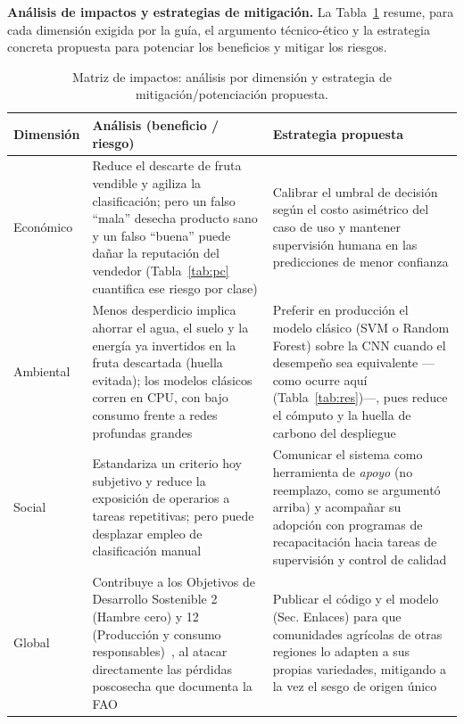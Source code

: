 \documentclass[conference]{IEEEtran}
\begin{document}
\textbf{Análisis de impactos y estrategias de mitigación.} La Tabla~\ref{tab:impactos}
resume, para cada dimensión exigida por la guía, el argumento técnico-ético y la
estrategia concreta propuesta para potenciar los beneficios y mitigar los
riesgos.

\begin{table}[t]
\caption{Matriz de impactos: análisis por dimensión y estrategia de
mitigación/potenciación propuesta.}
\label{tab:impactos}
\centering
\begin{tabular}{p{1.3cm}p{3.0cm}p{3.1cm}}
\toprule
Dimensión & Análisis (beneficio / riesgo) & Estrategia propuesta \\
\midrule
Económico & Reduce el descarte de fruta vendible y agiliza la clasificación;
pero un falso ``mala'' desecha producto sano y un falso ``buena'' puede dañar
la reputación del vendedor (Tabla~\ref{tab:pc} cuantifica ese riesgo por clase)
& Calibrar el umbral de decisión según el costo asimétrico del caso de uso y
mantener supervisión humana en las predicciones de menor confianza \\
Ambiental & Menos desperdicio implica ahorrar el agua, el suelo y la energía ya
invertidos en la fruta descartada (huella evitada); los modelos clásicos
corren en CPU, con bajo consumo frente a redes profundas grandes &
Preferir en producción el modelo clásico (SVM o Random Forest) sobre la CNN
cuando el desempeño sea equivalente —como ocurre aquí (Tabla~\ref{tab:res})—,
pues reduce el cómputo y la huella de carbono del despliegue \\
Social & Estandariza un criterio hoy subjetivo y reduce la exposición de
operarios a tareas repetitivas; pero puede desplazar empleo de clasificación
manual & Comunicar el sistema como herramienta de \emph{apoyo} (no reemplazo,
como se argumentó arriba) y acompañar su adopción con programas de
recapacitación hacia tareas de supervisión y control de calidad \\
Global & Contribuye a los Objetivos de Desarrollo Sostenible 2 (Hambre cero) y
12 (Producción y consumo responsables)~\cite{onu}, al atacar directamente las
pérdidas poscosecha que documenta la FAO~\cite{fao} & Publicar el código y el
modelo (Sec. Enlaces) para que comunidades agrícolas de otras regiones lo
adapten a sus propias variedades, mitigando a la vez el sesgo de origen único \\
\bottomrule
\end{tabular}
\end{table}

\end{document}
